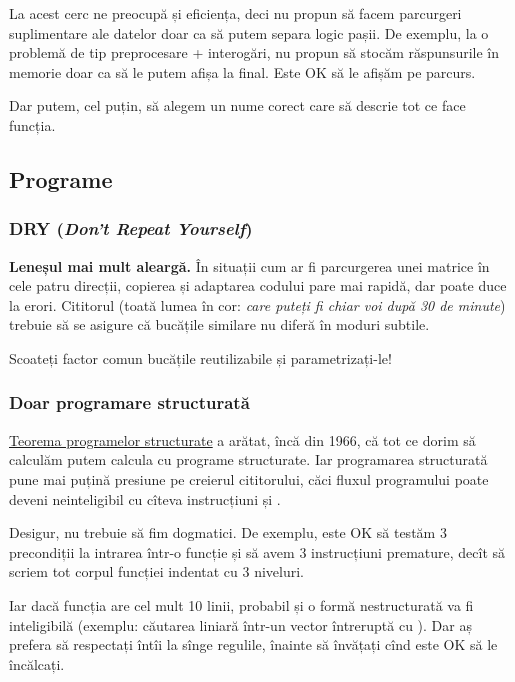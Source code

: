 \documentclass[../main.tex]{subfiles}
\begin{document}
La acest cerc ne preocupă și eficiența, deci nu propun să facem parcurgeri suplimentare ale datelor doar ca să putem separa logic pașii. De exemplu, la o problemă de tip preprocesare + interogări, nu propun să stocăm răspunsurile în memorie doar ca să le putem afișa la final. Este OK să le afișăm pe parcurs.

Dar putem, cel puțin, să alegem un nume corect care să descrie tot ce face funcția.

\subsection{Programe}

\subsubsection*{DRY (\textit{Don't Repeat Yourself})}

\textbf{Leneșul mai mult aleargă.} În situații cum ar fi parcurgerea unei matrice în cele patru direcții, copierea și adaptarea codului pare mai rapidă, dar poate duce la erori. Cititorul (toată lumea în cor: \textit{care puteți fi chiar voi după 30 de minute}) trebuie să se asigure că bucățile similare nu diferă în moduri subtile.

Scoateți factor comun bucățile reutilizabile și parametrizați-le!

\subsubsection*{Doar programare structurată}

\href{https://en.wikipedia.org/wiki/Structured_program_theorem}{Teorema programelor structurate} a arătat, încă din 1966, că tot ce dorim să calculăm putem calcula cu programe structurate. Iar programarea structurată pune mai puțină presiune pe creierul cititorului, căci fluxul programului poate deveni neinteligibil cu cîteva instrucțiuni  și .

Desigur, nu trebuie să fim dogmatici. De exemplu, este OK să testăm 3 precondiții la intrarea într-o funcție și să avem 3 instrucțiuni  premature, decît să scriem tot corpul funcției indentat cu 3 niveluri.

Iar dacă funcția are cel mult 10 linii, probabil și o formă nestructurată va fi inteligibilă (exemplu: căutarea liniară într-un vector întreruptă cu ). Dar aș prefera să respectați întîi la sînge regulile, înainte să învățați cînd este OK să le încălcați.
\end{document}
